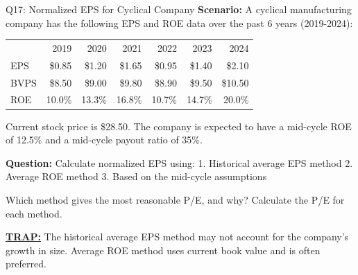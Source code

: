 \documentclass{beamer}
\renewcommand{\scriptsize}{\fontsize{6pt}{7pt}\selectfont}
\begin{document}
	\begin{frame}{Q17: Normalized EPS for Cyclical Company}
		\scriptsize
		\textbf{Scenario:} A cyclical manufacturing company has the following EPS and ROE data over the past 6 years (2019-2024):
		
		\begin{tabular}{lrrrrrr}
			& 2019 & 2020 & 2021 & 2022 & 2023 & 2024 \\
			EPS & \$0.85 & \$1.20 & \$1.65 & \$0.95 & \$1.40 & \$2.10 \\
			BVPS & \$8.50 & \$9.00 & \$9.80 & \$8.90 & \$9.50 & \$10.50 \\
			ROE & 10.0\% & 13.3\% & 16.8\% & 10.7\% & 14.7\% & 20.0\% \\
		\end{tabular}
		
		Current stock price is \$28.50. The company is expected to have a mid-cycle ROE of 12.5\% and a mid-cycle payout ratio of 35\%.
		
		\textbf{Question:} Calculate normalized EPS using:
		1. Historical average EPS method
		2. Average ROE method
		3. Based on the mid-cycle assumptions
		
		Which method gives the most reasonable P/E, and why? Calculate the P/E for each method.
		
		\vspace{2pt}
		\underline{\textbf{TRAP:}} The historical average EPS method may not account for the company's growth in size. Average ROE method uses current book value and is often preferred.
	\end{frame}
	
\end{document}

